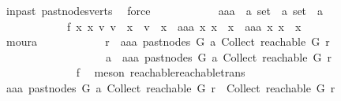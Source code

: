\begin{isabellebody}
\ in{\isacharunderscore}{\kern0pt}past\ past{\isacharunderscore}{\kern0pt}nodes{\isacharunderscore}{\kern0pt}verts\ \isamarkupfalse%
\ force\isanewline
\ \ \ \ \ \ \ \ \ \ \isamarkupfalse%
\ aaa\ {\isacharcolon}{\kern0pt}{\isacharcolon}{\kern0pt}\ {\isachardoublequoteopen}{\isacharprime}{\kern0pt}a\ set\ {\isasymRightarrow}\ {\isacharprime}{\kern0pt}a\ set\ {\isasymRightarrow}\ {\isacharprime}{\kern0pt}a{\isachardoublequoteclose}\ \isanewline
\ \ \ \ \ \ \ \ \ \ \ \ f{}{\isacharcolon}{\kern0pt}\ {\isachardoublequoteopen}{\isasymforall}x{}\ x{}{\isachardot}{\kern0pt}\ {\isacharparenleft}{\kern0pt}{\isasymexists}v{}{\isachardot}{\kern0pt}\ v{}\ {\isasymin}\ x{}\ {\isasymand}\ v{}\ {\isasymnotin}\ x{}{\isacharparenright}{\kern0pt}\ {\isacharequal}{\kern0pt}\ {\isacharparenleft}{\kern0pt}aaa\ x{}\ x{}\ {\isasymin}\ x{}\ {\isasymand}\ aaa\ x{}\ x{}\ {\isasymnotin}\ x{}{\isacharparenright}{\kern0pt}{\isachardoublequoteclose}\isanewline
\ \ \ \ \ \ \ \ \ \ \ \ \isamarkupfalse%
\ moura\isanewline
\ \ \ \ \ \ \ \ \ \ \isamarkupfalse%
\ {\isachardoublequoteopen}r\ {\isasymrightarrow}\isactrlsup {\isacharasterisk}{\kern0pt}\ aaa\ {\isacharparenleft}{\kern0pt}past{\isacharunderscore}{\kern0pt}nodes\ G\ a{\isacharparenright}{\kern0pt}\ {\isacharparenleft}{\kern0pt}Collect\ {\isacharparenleft}{\kern0pt}reachable\ G\ r{\isacharparenright}{\kern0pt}{\isacharparenright}{\kern0pt}\isanewline
\ \ \ \ \ \ \ \ \ \ \ \ \ \ \ \ \ \ {\isasymlongrightarrow}\ a\ {\isasymrightarrow}\isactrlsup {\isacharplus}{\kern0pt}\ aaa\ {\isacharparenleft}{\kern0pt}past{\isacharunderscore}{\kern0pt}nodes\ G\ a{\isacharparenright}{\kern0pt}\ {\isacharparenleft}{\kern0pt}Collect\ {\isacharparenleft}{\kern0pt}reachable\ G\ r{\isacharparenright}{\kern0pt}{\isacharparenright}{\kern0pt}{\isachardoublequoteclose}\isanewline
\ \ \ \ \ \ \ \ \ \ \ \ \isamarkupfalse%
\ f{}\ \isamarkupfalse%
\ {\isacharparenleft}{\kern0pt}meson\ reachable{}{\isacharunderscore}{\kern0pt}reachable{\isacharunderscore}{\kern0pt}trans{\isacharparenright}{\kern0pt}\isanewline
\ \ \ \ \ \ \ \ \ \ \isamarkupfalse%
\ \isamarkupfalse%
\ {\isachardoublequoteopen}aaa\ {\isacharparenleft}{\kern0pt}past{\isacharunderscore}{\kern0pt}nodes\ G\ a{\isacharparenright}{\kern0pt}\ {\isacharparenleft}{\kern0pt}Collect\ {\isacharparenleft}{\kern0pt}reachable\ G\ r{\isacharparenright}{\kern0pt}{\isacharparenright}{\kern0pt}\ {\isasymnotin}\ Collect\ {\isacharparenleft}{\kern0pt}reachable\ G\ r{\isacharparenright}{\kern0pt}\isanewline

\end{isabellebody}
